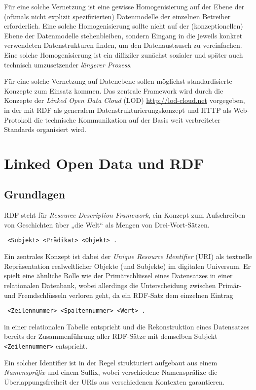 \documentclass[a4paper,11pt]{article}
\begin{document}
Für eine solche Vernetzung ist eine gewisse Homogenisierung auf der Ebene der
(oftmals nicht explizit spezifizierten) Datenmodelle der einzelnen Betreiber
erforderlich. Eine solche Homogenisierung sollte nicht auf der
(konzeptionellen) Ebene der Datenmodelle stehenbleiben, sondern Eingang in die
jeweils konkret verwendeten Datenstrukturen finden, um den Datenaustausch zu
vereinfachen. Eine solche Homogenisierung ist ein diffiziler zunächst sozialer
und später auch technisch umzusetzender \emph{längerer Prozess}. 

Für eine solche Vernetzung auf Datenebene sollen möglichst standardisierte
Konzepte zum Einsatz kommen.  Das zentrale Framework wird durch die Konzepte
der \emph{Linked Open Data Cloud} (LOD) \url{http://lod-cloud.net} vorgegeben,
in der mit RDF als generalem Datenstrukturierungskonzept und HTTP als
Web-Protokoll die technische Kommunikation auf der Basis weit verbreiteter
Standards organisiert wird. 

\section{Linked Open Data und RDF} 

\subsection{Grundlagen} 

RDF steht für \emph{Resource Description Framework}, ein Konzept zum
Aufschreiben von Geschichten über „die Welt“ als Mengen von Drei-Wort-Sätzen.
\begin{center}\tt
  <Subjekt> <Prädikat> <Objekt> .
\end{center}
Ein zentrales Konzept ist dabei der \emph{Unique Resource Identifier} (URI) als
textuelle Repräsentation realweltlicher Objekte (und Subjekte) im digitalen
Universum.  Er spielt eine ähnliche Rolle wie der Primärschlüssel eines
Datensatzes in einer relationalen Datenbank, wobei allerdings die
Unterscheidung zwischen Primär- und Fremdschlüsseln verloren geht, da ein
RDF-Satz dem einzelnen Eintrag
\begin{center}\tt
  <Zeilennummer> <Spaltennummer> <Wert> .
\end{center}
in einer relationalen Tabelle entspricht und die Rekonstruktion eines
Datensatzes bereits der Zusammenführung aller RDF-Sätze mit demselben Subjekt
\texttt{<Zeilennummer>} entspricht.

Ein solcher Identifier ist in der Regel strukturiert aufgebaut aus einem
\emph{Namenspräfix} und einem Suffix, wobei verschiedene Namenspräfixe die
Überlappungsfreiheit der URIs aus verschiedenen Kontexten garantieren.  
\end{document}
